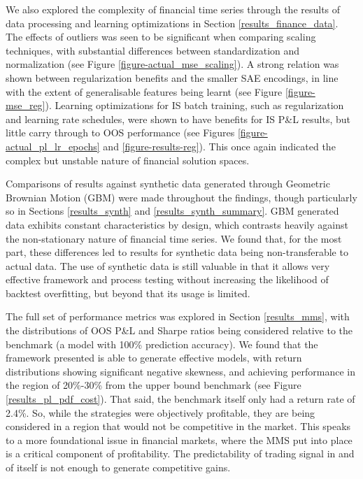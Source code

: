 \documentclass[a4paper,11pt,oneside]{article}
\theoremstyle{plain}
\theoremstyle{definition}
\begin{document}
	We also explored the complexity of financial time series through the results of data processing and learning optimizations in Section \ref{results_finance_data}. The effects of outliers was seen to be significant when comparing scaling techniques, with substantial differences between standardization and normalization (see Figure \ref{figure-actual_mse_scaling}). A strong relation was shown between regularization benefits and the smaller SAE encodings, in line with the extent of generalisable features being learnt (see Figure \ref{figure-mse_reg}). Learning optimizations for IS batch training, such as regularization and learning rate schedules, were shown to have benefits for IS P\&L results, but little carry through to OOS performance (see Figures \ref{figure-actual_pl_lr_epochs} and \ref{figure-results-reg}). This once again indicated the complex but unstable nature of financial solution spaces.\newline	
	
	Comparisons of results against synthetic data generated through Geometric Brownian Motion (GBM) were made throughout the findings, though particularly so in Sections \ref{results_synth} and \ref{results_synth_summary}. GBM generated data exhibits constant characteristics by design, which contrasts heavily against the non-stationary nature of financial time series. We found that, for the most part, these differences led to results for synthetic data being non-transferable to actual data. The use of synthetic data is still valuable in that it allows very effective framework and process testing without increasing the likelihood of backtest overfitting, but beyond that its usage is limited. \newline
	
	The full set of performance metrics was explored in Section \ref{results_mms}, with the distributions of OOS P\&L and Sharpe ratios being considered relative to the benchmark (a model with 100\% prediction accuracy). We found that the framework presented is able to generate effective models, with return distributions showing significant negative skewness, and achieving performance in the region of 20\%-30\% from the upper bound benchmark (see Figure \ref{results_pl_pdf_cost}). That said, the benchmark itself only had a return rate of 2.4\%. So, while the strategies were objectively profitable, they are being considered in a region that would not be competitive in the market. This speaks to a more foundational issue in financial markets, where the MMS put into place is a critical component of profitability. The predictability of trading signal in and of itself is not enough to generate competitive gains.\newline
	
\end{document}
